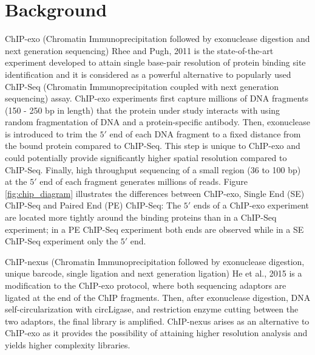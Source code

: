 \documentclass{bmcart}
\begin{document}
\newpage

\section*{Background}
\label{sec:intro}

ChIP-exo (Chromatin Immunoprecipitation followed by exonuclease
digestion and next generation sequencing) Rhee and Pugh, 2011
\nocite{exo1} is the state-of-the-art experiment developed to attain
single base-pair resolution of protein binding site identification and
it is considered as a powerful alternative to popularly used ChIP-Seq
(Chromatin Immunoprecipitation coupled with next generation
sequencing) assay. ChIP-exo experiments first capture millions of DNA
fragments (150 - 250 bp in length) that the protein under study
interacts with using random fragmentation of DNA and a
protein-specific antibody. Then, exonuclease is introduced to trim the
$5\prime$ end of each DNA fragment to a fixed distance from the bound
protein compared to ChIP-Seq. This step is unique to ChIP-exo and
could potentially provide significantly higher spatial resolution
compared to ChIP-Seq. Finally, high throughput sequencing of a small
region (36 to 100 bp) at the $5\prime$ end of each fragment generates
millions of reads. Figure \ref{fig:chip_diagram} illustrates the
differences between ChIP-exo, Single End (SE) ChIP-Seq and Paired End
(PE) ChIP-Seq: The $5\prime$ ends of a ChIP-exo experiment are located
more tightly around the binding proteins than in a ChIP-Seq
experiment; in a PE ChIP-Seq experiment both ends are observed while
in a SE ChIP-Seq experiment only the $5\prime$ end.

ChIP-nexus (Chromatin Immunoprecipitation followed by exonuclease
digestion, unique barcode, single ligation and next generation
ligation) He et al., 2015 \nocite{chipnexus} is a modification to the
ChIP-exo protocol, where both sequencing adaptors are ligated at the
end of the ChIP fragments. Then, after exonuclease digestion, DNA
self-circularization with circLigase, and restriction enzyme cutting
between the two adaptors, the final library is amplified. ChIP-nexus
arises as an alternative to ChIP-exo as it provides the possibility of
attaining higher resolution analysis and yields higher complexity
libraries.
\end{document}
